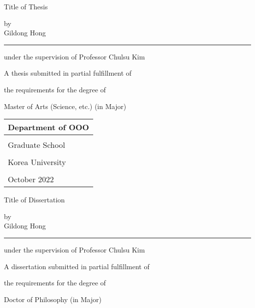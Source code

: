 \documentclass[11pt]{report}
\numberwithin{figure}{section}
\theoremstyle{plain}
\theoremstyle{definition}
\theoremstyle{corollary}
\theoremstyle{definition}
\theoremstyle{plain}
\theoremstyle{definition}
\theoremstyle{plain}
\begin{document}
\newpage
\begin{center}
\huge Title of Thesis
\par\vspace{50pt}
\Large by\\
Gildong Hong
\par\vspace{20pt}
\rule{.6\textwidth}{0.4pt}
\par\vspace{20pt}
under the supervision of Professor Chulsu Kim
\par\vspace{20pt}
A thesis submitted in partial fulfillment of \par
the requirements for the degree of \par
Master of Arts (Science, etc.) (in Major)
\par\vspace{10pt}
\end{center}
\noindent
\begin{tabularx}{\textwidth}{| >{\centering\arraybackslash}X |}
\arrayrulecolor{blue}
\hline
\Large Department of OOO \\\hline
\rule{0pt}{30pt}\\\hline
\LARGE Graduate School \\\hline
\\[-8pt]\hline
\LARGE Korea University \\\hline
\rule{0pt}{20pt}\\\hline
\large October 2022 \\\hline
\end{tabularx}

\newpage
\begin{center}
\huge Title of Dissertation
\par\vspace{50pt}
\Large by\\
Gildong Hong
\par\vspace{20pt}
\rule{.6\textwidth}{0.4pt}
\par\vspace{20pt}
under the supervision of Professor Chulsu Kim
\par\vspace{20pt}
A dissertation submitted in partial fulfillment of \par
the requirements for the degree of \par
Doctor of Philosophy (in Major)
\par\vspace{10pt}
\end{center}
\end{document}
